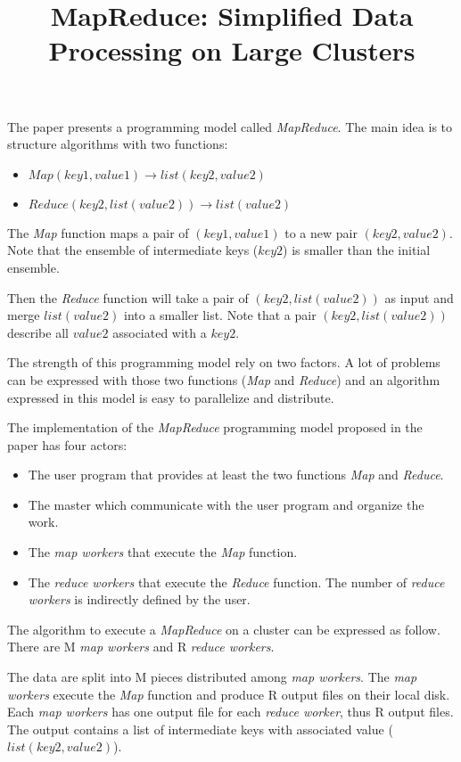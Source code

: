\documentclass{article}
\title{MapReduce: Simplified Data Processing on Large Clusters}
\begin{document}
\maketitle

The paper presents a programming model called \textit{MapReduce}.
The main idea is to structure algorithms with two functions:
\begin{itemize}
	\item $Map (key1, value1) \rightarrow list(key2,value2)$
	\item $Reduce (key2, list(value2)) \rightarrow list(value2)$
\end{itemize}

The \textit{Map} function maps a pair of $(key1,value1)$ to a new pair $(key2, value2)$.
Note that the ensemble of intermediate keys ($key2$) is smaller than the initial ensemble.

Then the \textit{Reduce} function will take a pair of $(key2, list(value2))$ as input and merge $list(value2)$ into a smaller list.
Note that a pair $(key2, list(value2))$ describe all $value2$ associated with a $key2$.

The strength of this programming model rely on two factors.
A lot of problems can be expressed with those two functions (\textit{Map} and \textit{Reduce}) and an algorithm expressed in this model is easy to parallelize and distribute.

The implementation of the \textit{MapReduce} programming model proposed in the paper has four actors:
\begin{itemize}
	\item The user program that provides at least the two functions \textit{Map} and \textit{Reduce}.
	\item The master which communicate with the user program and organize the work.
	\item The \textit{map workers} that execute the \textit{Map} function.
	\item The \textit{reduce workers} that execute the \textit{Reduce} function. The number of \textit{reduce workers} is indirectly defined by the user.
\end{itemize}

The algorithm to execute a \textit{MapReduce} on a cluster can be expressed as follow.
There are M \textit{map workers} and R \textit{reduce workers}.

The data are split into M pieces distributed among \textit{map workers}.
The \textit{map workers} execute the \textit{Map} function and produce R output files on their local disk.
Each \textit{map workers} has one output file for each \textit{reduce worker}, thus R output files.
The output contains a list of intermediate keys with associated value ($list(key2, value2)$).
\end{document}
